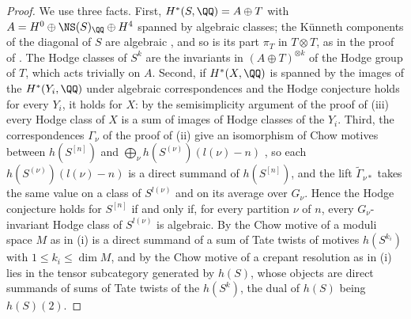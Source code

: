 \begin{proof}
We use three facts. First, $H^{*}(S,\QQ)=A\oplus T$ with
$A=H^{0}\oplus\NS(S)_{\QQ}\oplus H^{4}$ spanned by algebraic classes; the
K\"unneth components of the diagonal of $S$ are algebraic \cite{Mur90}, and
so is its part $\pi_{T}$ in $T\otimes T$, as in the proof of
. The Hodge classes of $S^{k}$ are the invariants in
$(A\oplus T)^{\otimes k}$ of the Hodge group of $T$, which acts trivially on
$A$. Second, if $H^{*}(X,\QQ)$ is spanned by the images of the
$H^{*}(Y_{i},\QQ)$ under algebraic correspondences and the Hodge conjecture
holds for every $Y_{i}$, it holds for $X$: by the semisimplicity argument of
the proof of (iii) every Hodge class of $X$ is a sum of
images of Hodge classes of the $Y_{i}$. Third, the correspondences
$\Gamma_{\nu}$ of the proof of (ii) give an isomorphism
of Chow motives between $h(S^{[n]})$ and
$\bigoplus_{\nu}h(S^{(\nu)})(l(\nu)-n)$ \cite{dCM02}, so each
$h(S^{(\nu)})(l(\nu)-n)$ is a direct summand of $h(S^{[n]})$, and the lift
$\widetilde\Gamma_{\nu*}$ takes the same value on a class of $S^{l(\nu)}$ and
on its average over $G_{\nu}$. Hence the Hodge
conjecture holds for $S^{[n]}$ if and only if, for every partition $\nu$ of
$n$, every $G_{\nu}$-invariant Hodge class of $S^{l(\nu)}$ is algebraic. By
\cite[Theorem~0.1, Remark~2.1]{Bue20} the Chow motive of a moduli space $M$
as in (i) is a direct summand of a sum of Tate twists of motives
$h(S^{k_{i}})$ with $1\le k_{i}\le\dim M$, and by
\cite[Corollary~4.5]{FFZ21} the Chow motive of a crepant resolution as in (i)
lies in the tensor subcategory generated by $h(S)$, whose objects are direct
summands of sums of
Tate twists of the $h(S^{k})$, the dual of $h(S)$ being $h(S)(2)$.


\end{proof}
